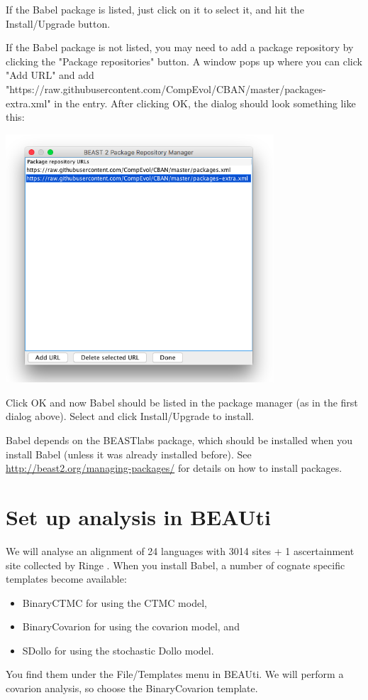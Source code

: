 \documentclass{article}
\begin{document}
If the Babel package is listed, just click on it to select it, and hit the Install/Upgrade button.

If the Babel package is not listed, you may need to add a package repository by clicking the "Package repositories" button. A window pops up where you can click "Add URL" and add "https://raw.githubusercontent.com/CompEvol/CBAN/master/packages-extra.xml" in the entry. After clicking OK, the dialog should look something like this:

\begin{center}
\includegraphics[width=0.75\textwidth]{package_repos.png}
\end{center}

Click OK and now Babel should be listed in the package manager (as in the first dialog above). Select and click Install/Upgrade to install.

Babel depends on the BEASTlabs package, which should be installed when you install Babel (unless it was already installed before).
See \url{http://beast2.org/managing-packages/} for details on how to install packages.

\section*{Set up analysis in BEAUti}

We will analyse an alignment of 24 languages  with 3014 sites + 1 ascertainment site collected by Ringe \cite{ringe2001}. 
When you install Babel, a number of cognate specific templates become available: 
\begin{itemize}
\item BinaryCTMC for using the CTMC model\cite{gray2003language,IE2013},
\item BinaryCovarion for using the covarion model\cite{tuffley1998modeling,IE2013,gray2009language}, and
\item SDollo for using the stochastic Dollo model\cite{nicholls2008dated,alekseyenko2008wagner,atkinson2005words}.
\end{itemize}
You find them under the File/Templates menu in BEAUti. We will perform a covarion analysis, so choose the BinaryCovarion template.
\end{document}
